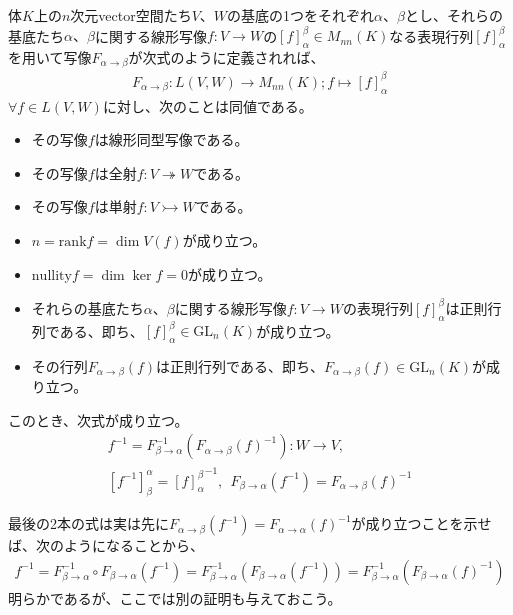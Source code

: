 \documentclass[dvipdfmx]{jsarticle}
\begin{document}
\begin{thm}
\label{2.1.5.16}
体$K$上の$n$次元vector空間たち$V$、$W$の基底の1つをそれぞれ$\alpha$、$\beta$とし、それらの基底たち$\alpha 、\beta$に関する線形写像$f:V \rightarrow W$の$[ f]^{\beta}_{\alpha} \in M_{nn}(K)$なる表現行列$[ f]^{\beta}_{\alpha}$を用いて写像$F_{\alpha \rightarrow \beta}$が次式のように定義されれば、
\begin{align*}
F_{\alpha \rightarrow \beta}:L(V,W) \rightarrow M_{nn}(K);f \mapsto [ f]^{\beta}_{\alpha}
\end{align*}
$\forall f \in L(V,W)$に対し、次のことは同値である。
\begin{itemize}
\item
  その写像$f$は線形同型写像である。
\item
  その写像$f$は全射$f:V \twoheadrightarrow W$である。
\item
  その写像$f$は単射$f:V \rightarrowtail W$である。
\item
  $n = {\mathrm{rank}}f = \dim{V(f)}$が成り立つ。
\item
  ${\mathrm{nullity}}f = \dim{\ker f} = 0$が成り立つ。
\item
  それらの基底たち$\alpha$、$\beta$に関する線形写像$f:V \rightarrow W$の表現行列$[ f]^{\beta}_{\alpha}$は正則行列である、即ち、$[ f]^{\beta}_{\alpha} \in {\mathrm{GL}}_{n}(K)$が成り立つ。
\item
  その行列$F_{\alpha \rightarrow \beta}(f)$は正則行列である、即ち、$F_{\alpha \rightarrow \beta}(f) \in {\mathrm{GL}}_{n}(K)$が成り立つ。
\end{itemize}
このとき、次式が成り立つ。
\begin{align*}
f^{- 1} = F_{\beta \rightarrow \alpha}^{- 1}\left( {F_{\alpha \rightarrow \beta}(f)}^{- 1} \right):W \rightarrow V, \\
\left[ f^{- 1} \right]^{\alpha}_{\beta} = {[ f]^{\beta}_{\alpha}}^{- 1},\ \ F_{\beta \rightarrow \alpha}\left( f^{- 1} \right) = {F_{\alpha \rightarrow \beta}(f)}^{- 1}
\end{align*}\par
最後の2本の式は実は先に$F_{\alpha \rightarrow \beta}\left( f^{- 1} \right) = {F_{\alpha \rightarrow \alpha}(f)}^{- 1}$が成り立つことを示せば、次のようになることから、
\begin{align*}
f^{- 1} = F_{\beta \rightarrow \alpha}^{- 1} \circ F_{\beta \rightarrow \alpha}\left( f^{- 1} \right) = F_{\beta \rightarrow \alpha}^{- 1}\left( F_{\beta \rightarrow \alpha}\left( f^{- 1} \right) \right) = F_{\beta \rightarrow \alpha}^{- 1}\left( {F_{\beta \rightarrow \alpha}(f)}^{- 1} \right)
\end{align*}
明らかであるが、ここでは別の証明も与えておこう。
\end{thm}
\end{document}
